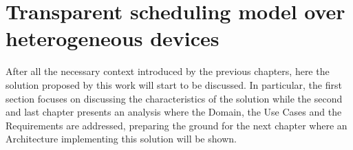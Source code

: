 \chapter{Transparent scheduling model over heterogeneous devices}
After all the necessary context introduced by the previous chapters, here the solution proposed by this work will start to be discussed. In particular, the first section focuses on discussing the characteristics of the solution while the second and last chapter presents an analysis where the Domain, the Use Cases and the Requirements are addressed, preparing the ground for the next chapter where an Architecture implementing this solution will be shown.


